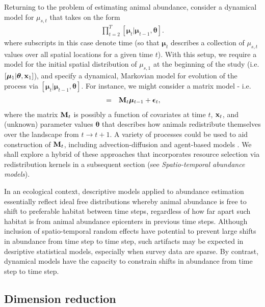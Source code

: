 \documentclass[12pt,english]{article}
\begin{document}
\begin{spacing}{1.9}
Returning to the problem of estimating animal abundance, consider a dynamical model for $\mu_{s,t}$ that takes on the form
\begin{eqnarray}
  [\boldsymbol{\mu}|\boldsymbol{\theta} & = & [\boldsymbol{\mu}_1 | \boldsymbol{\theta}] \prod_{t=2}^T [\boldsymbol{\mu}_t | \boldsymbol{\mu}_{t-1},\boldsymbol{\theta}].
  \label{eq:mu}
\end{eqnarray}
where subscripts in this case denote time (so that $\boldsymbol{\mu}_t$ describes a collection of $\mu_{s,t}$ values over all spatial locations for a given time $t$).  With this setup, we require a model for the initial spatial distribution of $\mu_{s,1}$ at the beginning of the study (i.e. $[\boldsymbol{\mu}_1 | \boldsymbol{\theta},{\bf x}_1]$), and
specify a dynamical, Markovian model for evolution of the process via $[\boldsymbol{\mu}_t | \boldsymbol{\mu}_{t-1},\boldsymbol{\theta}]$.  For instance, we might consider a matrix model - i.e.
\begin{eqnarray}
[\boldsymbol{\mu}_t | \boldsymbol{\mu}_{t-1},\boldsymbol{\theta}] & = & {\bf M}_t \boldsymbol{\mu}_{t-1} + \boldsymbol{\epsilon}_t,
 \label{eq:matrix-mod}
\end{eqnarray}
where the matrix ${\bf M}_t$ is possibly a function of covariates at time $t$, ${\bf x}_t$, and (unknown) parameter values $\boldsymbol{\theta}$ that describes how animals
redistribute themselves over the landscape from $t \rightarrow t+1$.  A variety of processes could be used to aid construction of ${\bf M}_t$, including advection-diffusion \citep{Wikle2003} and agent-based models \citep{HootenWikle2010}.  We shall explore a hybrid of these approaches that incorporates resource selection via redistribution kernels in a subsequent section (see {\it Spatio-temporal abundance models}).

In an ecological context, descriptive models applied to abundance estimation essentially reflect ideal free distributions \citep{FretwellLucas1970} whereby animal abundance is free to shift to preferable habitat between time steps, regardless of how far apart such habitat is from animal abundance epicenters in previous time steps.  Although inclusion of spatio-temporal random effects have potential to prevent large shifts in abundance from time step to time step, such artifacts may be expected in desriptive statistical models, especially when survey data are sparse.  By contrast, dynamical models have the capacity to constrain shifts in abundance from time step to time step.

\subsection{Dimension reduction}


\end{spacing}
\end{document}
